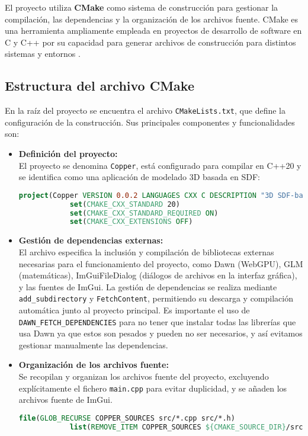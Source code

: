 El proyecto utiliza \textbf{CMake} como sistema de construcción para gestionar
la compilación, las dependencias y la organización de los archivos fuente.
CMake es una herramienta ampliamente empleada en proyectos de desarrollo de
software en C y C++ por su capacidad para generar archivos de construcción para
distintos sistemas y entornos \cite{cmake-docs}.

\subsection{Estructura del archivo CMake}

En la raíz del proyecto se encuentra el archivo \texttt{CMakeLists.txt}, que
define la configuración de la construcción. Sus principales componentes y
funcionalidades son:

\begin{itemize}
    \item \textbf{Definición del proyecto:}\\
          El proyecto se denomina \texttt{Copper}, está configurado para compilar en C++20 y se identifica como una aplicación de modelado 3D basada en SDF:
          \begin{lstlisting}[language=CMake, caption={Definición del proyecto en CMakeLists.txt}]
            project(Copper VERSION 0.0.2 LANGUAGES CXX C DESCRIPTION "3D SDF-based modeling application")
            set(CMAKE_CXX_STANDARD 20)
            set(CMAKE_CXX_STANDARD_REQUIRED ON)
            set(CMAKE_CXX_EXTENSIONS OFF)
\end{lstlisting}

    \item \textbf{Gestión de dependencias externas:}\\
          El archivo especifica la inclusión y compilación de bibliotecas externas necesarias para el funcionamiento del proyecto, como Dawn (WebGPU), GLM (matemáticas), ImGuiFileDialog (diálogos de archivos en la interfaz gráfica), y las fuentes de ImGui. La gestión de dependencias se realiza mediante \texttt{add\_subdirectory} y \texttt{FetchContent}, permitiendo su descarga y compilación automática junto al proyecto principal. 
          Es importante el uso de \texttt{DAWN\_FETCH\_DEPENDENCIES} para no tener que instalar todas las librerías que usa Dawn ya que estos son pesados y pueden no ser necesarios, y así evitamos gestionar manualmente las dependencias.

    \item \textbf{Organización de los archivos fuente:}\\
          Se recopilan y organizan los archivos fuente del proyecto, excluyendo explícitamente el fichero \texttt{main.cpp} para evitar duplicidad, y se añaden los archivos fuente de ImGui.
          \begin{lstlisting}[language=CMake, caption={Organización de los archivos fuente en CMakeLists.txt}]
            file(GLOB_RECURSE COPPER_SOURCES src/*.cpp src/*.h)
            list(REMOVE_ITEM COPPER_SOURCES ${CMAKE_SOURCE_DIR}/src/main.cpp)\end{lstlisting}


\end{itemize}
